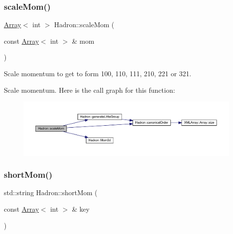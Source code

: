 \subsubsection{\texorpdfstring{scaleMom()}{scaleMom()}}
{\footnotesize\ttfamily \mbox{\hyperlink{classXMLArray_1_1Array}{Array}}$<$ int $>$ Hadron\+::scale\+Mom (\begin{DoxyParamCaption}\item[{const \mbox{\hyperlink{classXMLArray_1_1Array}{Array}}$<$ int $>$ \&}]{mom }\end{DoxyParamCaption})}



Scale momentum to get to form 100, 110, 111, 210, 221 or 321. 

Scale momentum. Here is the call graph for this function\+:
\nopagebreak
\begin{figure}[H]
\begin{center}
\leavevmode
\includegraphics[width=350pt]{d1/daf/namespaceHadron_ab3424b316e2a4d8e820c88f8027742e1_cgraph}
\end{center}
\end{figure}
\mbox{\label{namespaceHadron_aaaec62d26ea28ccc4d611b4797a1d667}} 
\subsubsection{\texorpdfstring{shortMom()}{shortMom()}}
{\footnotesize\ttfamily std\+::string Hadron\+::short\+Mom (\begin{DoxyParamCaption}\item[{const \mbox{\hyperlink{classXMLArray_1_1Array}{Array}}$<$ int $>$ \&}]{key }\end{DoxyParamCaption})}


